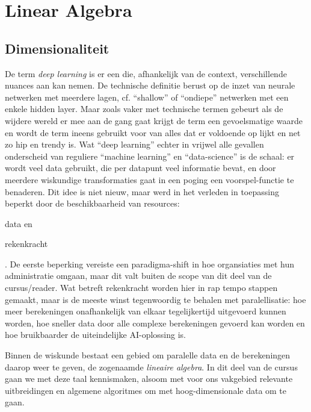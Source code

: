\chapter{Linear Algebra}\label{ch:la}

\section{Dimensionaliteit}
De term \emph{deep learning} is er een die, afhankelijk van de context, verschillende nuances aan kan nemen. De technische definitie berust op de inzet van neurale netwerken met meerdere lagen, cf. \enquote{shallow} of \enquote{ondiepe} netwerken met een enkele hidden layer. Maar zoals vaker met technische termen gebeurt als de wijdere wereld er mee aan de gang gaat krijgt de term een gevoelsmatige waarde en wordt de term ineens gebruikt voor van alles dat er voldoende op lijkt en net zo hip en trendy is. Wat \enquote{deep learning} echter in vrijwel alle gevallen onderscheid van reguliere \enquote{machine learning} en \enquote{data-science} is de schaal: er wordt veel data gebruikt, die per datapunt veel informatie bevat, en door meerdere wiskundige transformaties gaat in een poging een voorspel-functie te benaderen. Dit idee is niet nieuw, maar werd in het verleden in toepassing beperkt door de beschikbaarheid van resources: \begin{inparaenum}\item data en \item rekenkracht\end{inparaenum}. De eerste beperking vereiste een paradigma-shift in hoe organsiaties met hun administratie omgaan, maar dit valt buiten de scope van dit deel van de cursus/reader. Wat betreft rekenkracht worden hier in rap tempo stappen gemaakt, maar is de meeste winst tegenwoordig te behalen met paralellisatie: hoe meer berekeningen onafhankelijk van elkaar tegelijkertijd uitgevoerd kunnen worden, hoe sneller data door alle complexe berekeningen gevoerd kan worden en hoe bruikbaarder de uiteindelijke AI-oplossing is.

Binnen de wiskunde bestaat een gebied om paralelle data en de berekeningen daarop weer te geven, de zogenaamde \emph{lineaire algebra}. In dit deel van de cursus gaan we met deze taal kennismaken, alsoom met voor ons vakgebied relevante uitbreidingen en algemene algoritmes om met hoog-dimensionale data om te gaan.



